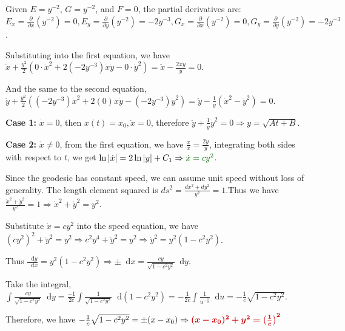 \documentclass[a4paper,12pt]{article}
\newcommand{\formu}[1]{\textcolor{formulacolor}{\bm{#1}}}
\newcommand{\sol}[1]{\textcolor{examplecolor}{#1}}
\renewcommand{\d}{\mathop{}\!\mathrm{d}}
\begin{document}
\begin{enumerate}[label=(\roman*)]
    Given $E = y^{-2}$, $G = y^{-2}$, and $F=0$, the partial derivatives are: $E_x = \frac{\partial}{\partial x}(y^{-2}) = 0,E_y = \frac{\partial}{\partial y}(y^{-2}) = -2y^{-3},G_x = \frac{\partial}{\partial x}(y^{-2}) = 0,G_y = \frac{\partial}{\partial y}(y^{-2}) = -2y^{-3}$.\par
    Substituting into the first equation, we have \sol{$\ddot{x}+\frac{y^2}{2}\left( 0 \cdot \dot{x}^2 + 2(-2y^{-3})\dot{x}\dot{y} - 0 \cdot \dot{y}^2 \right)=\ddot{x}-\frac{2\dot{x}\dot{y}}{y}=0$}.\par
    And the same to the second equation, \sol{$\ddot{y}+\frac{y^2}{2}\left( (-2y^{-3})\dot{x}^2 + 2(0)\dot{x}\dot{y} - (-2y^{-3})\dot{y}^2 \right)=\ddot{y}-\frac{1}{y}(\dot{x}^2 - \dot{y}^2)=0$}.\par
    \textbf{Case 1:} $\dot{x}=0$, then $x(t)=x_0,\ddot{x}=0$, therefore $\ddot{y}+\frac{1}{y}\dot{y}^2=0\Rightarrow y=\sqrt{At+B}$.\par
    \textbf{Case 2:} $\dot{x}\neq 0$, from the first equation, we have \sol{$\frac{\ddot{x}}{\dot{x}}=\frac{2\dot{y}}{y}$}, integrating both sides with respect to $t$, we get $\ln|\dot{x}|=2\ln|y|+C_1\Rightarrow \sol{\dot{x}=cy^2}$.\par
    Since the geodesic has constant speed, we can assume unit speed without loss of generality. The length element squared is $ds^2=\frac{dx^2+dy^2}{y^2}=1$.Thus we have \sol{$\frac{\dot{x}^2+\dot{y}^2}{y^2}=1\Rightarrow \dot{x}^2+\dot{y}^2=y^2$}.\par
    Substitute $\dot{x}=cy^2$ into the speed equation, we have \sol{$(cy^2)^2+\dot{y}^2=y^2\Rightarrow c^2y^4+\dot{y}^2=y^2\Rightarrow \dot{y}^2=y^2(1-c^2y^2)$}.\par
    Thus $\frac{\d y}{\d x}=y^2(1-c^2y^2)\Rightarrow \pm\d x=\frac{cy}{\sqrt{1-c^2y^2}}\d y$.\par
    Take the integral, $\int\frac{cy}{\sqrt{1-c^2y^2}}\d y=\frac{-1}{2c}\int\frac{1}{\sqrt{1-c^2y^2}}\d(1-c^2y^2)=-\frac{1}{2c}\int\frac{1}{u^{-\frac{1}{2}}}\d u=-\frac{1}{c}\sqrt{1-c^2y^2}$.\par
    Therefore, we have \sol{$-\frac{1}{c}\sqrt{1-c^2y^2}=\pm(x-x_0)\Rightarrow \formu{(x - x_0)^2 + y^2 = \left(\frac{1}{c}\right)^2}$}
\end{enumerate}
\end{document}
